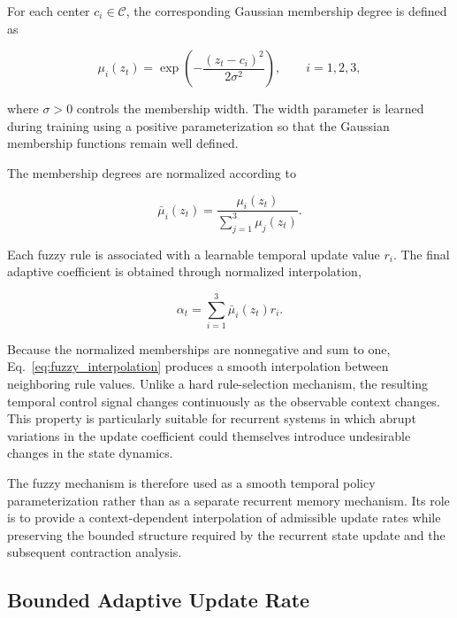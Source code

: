 \documentclass[journal]{IEEEtran}
\begin{document}
For each center $c_i\in\mathcal{C}$, the corresponding Gaussian membership degree is defined as

\begin{equation}
	\mu_i(z_t)
	=
	\exp
	\left(
	-\frac{(z_t-c_i)^2}{2\sigma^2}
	\right),
	\qquad
	i=1,2,3,
	\label{eq:membership}
\end{equation}

where $\sigma>0$ controls the membership width. The width parameter is learned during training using a positive parameterization so that the Gaussian membership functions remain well defined.

The membership degrees are normalized according to

\begin{equation}
	\bar{\mu}_i(z_t)
	=
	\frac{\mu_i(z_t)}
	{\displaystyle\sum_{j=1}^{3}\mu_j(z_t)}.
	\label{eq:normalized_membership}
\end{equation}

Each fuzzy rule is associated with a learnable temporal update value $r_i$. The final adaptive coefficient is obtained through normalized interpolation,

\begin{equation}
	\alpha_t
	=
	\sum_{i=1}^{3}
	\bar{\mu}_i(z_t)r_i.
	\label{eq:fuzzy_interpolation}
\end{equation}

Because the normalized memberships are nonnegative and sum to one, Eq.~\eqref{eq:fuzzy_interpolation} produces a smooth interpolation between neighboring rule values. Unlike a hard rule-selection mechanism, the resulting temporal control signal changes continuously as the observable context changes. This property is particularly suitable for recurrent systems in which abrupt variations in the update coefficient could themselves introduce undesirable changes in the state dynamics.

The fuzzy mechanism is therefore used as a smooth temporal policy parameterization rather than as a separate recurrent memory mechanism. Its role is to provide a context-dependent interpolation of admissible update rates while preserving the bounded structure required by the recurrent state update and the subsequent contraction analysis.

\subsection{Bounded Adaptive Update Rate}
\label{subsec:bounded_alpha}
\end{document}
